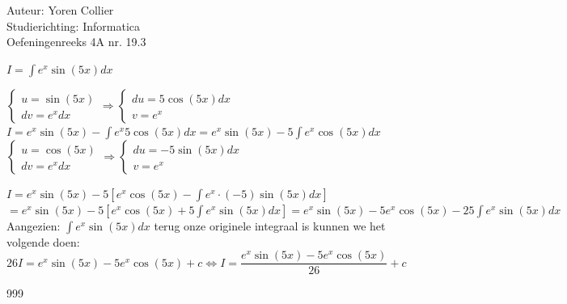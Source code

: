 \documentclass[a4paper]{article}
\newcommand{\asa}{\Leftrightarrow} %
\newcommand{\adR}{\Rightarrow} %
\newcommand{\Lh}{\left(} %
\newcommand{\Rh}{\right)}
\newcommand{\Lv}{\left[} %
\newcommand{\Rv}{\right]}
\newcommand{\La}{\left\{} %
\newcommand{\Ras}{\right.} %
\newcommand{\intgrl}{\displaystyle\int} %
\begin{document}
\noindent \large Auteur: Yoren Collier \\
\noindent \large Studierichting: Informatica\\
\noindent \large Oefeningenreeks 4A nr. 19.3\\

\medskip

\normalsize

$ I =  \intgrl e^x \sin \Lh 5x \Rh dx $

$\La
\begin{array}{l}
u = \sin \Lh 5x \Rh  \\
dv = e^x dx  
\end{array}
\Ras
\adR
\La
\begin{array}{l}
du = 5 \cos \Lh 5x \Rh dx \\
v = e^x   
\end{array}
\Ras$\\

$I = e^x \sin \Lh 5x \Rh - \intgrl e^x 5\cos \Lh 5x \Rh dx = e^x \sin \Lh 5x \Rh - 5\intgrl e^x \cos \Lh 5x \Rh dx $\\

$\La
\begin{array}{l}
u = \cos \Lh 5x \Rh  \\
dv = e^x dx  
\end{array}
\Ras
\adR
\La
\begin{array}{l}
du = -5 \sin \Lh 5x \Rh dx  \\
v = e^x   
\end{array}
\Ras$

$I = e^x \sin \Lh 5x \Rh -5 \Lv e^x \cos \Lh 5x \Rh - \intgrl e^x \cdot \Lh -5 \Rh \sin \Lh 5x \Rh dx \Rv$\\

$= e^x \sin \Lh 5x \Rh -5 \Lv e^x \cos \Lh 5x \Rh +5\intgrl e^x \sin \Lh 5x \Rh dx \Rv = e^x \sin \Lh 5x \Rh -5e^x \cos \Lh 5x \Rh - 25\intgrl e^x \sin \Lh 5x \Rh dx$\\

Aangezien: $\intgrl e^x \sin \Lh 5x \Rh dx$ terug onze originele integraal is kunnen we het volgende doen:\\

$26I = e^x \sin \Lh 5x \Rh -5e^x \cos \Lh 5x \Rh +c \asa I = \dfrac{e^x \sin \Lh 5x \Rh -5e^x \cos \Lh 5x \Rh}{26} + c$

\begin{thebibliography}{999}
\end{thebibliography}
\end{document}
